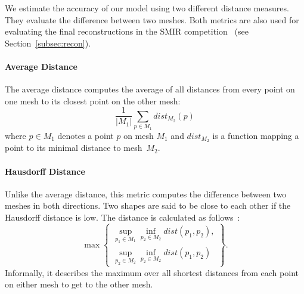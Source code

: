 We estimate the accuracy of our model using two different distance measures.
They evaluate the difference between two meshes.
Both metrics are also used for evaluating the final reconstructions in the SMIR competition~\cite{smir} (see Section~\ref{subsec:recon}).

\paragraph{Average Distance}
The average distance computes the average of all distances from every point on one mesh to its closest point on the other mesh:
$$ \frac{1}{|M_1|} \sum_{p \in M_1} \mathit{dist}_{M_2}(p) $$
where $p \in M_1$ denotes a point $p$ on mesh $M_1$ and $\mathit{dist}_{M_2}$ is a function mapping a point to its minimal distance to mesh~$M_2$.

\paragraph{Hausdorff Distance}
Unlike the average distance, this metric computes the difference between two meshes in both directions.
Two shapes are said to be close to each other if the Hausdorff distance is low.
The distance is calculated as follows~\cite{hausdorff}:
$$ \max \left\{ \begin{array}{ll}
  \sup_{p_1 \in M_1} \inf_{p_2 \in M_2} \mathit{dist}(p_1, p_2), \\
  \sup_{p_2 \in M_2} \inf_{p_2 \in M_2} \mathit{dist}(p_1, p_2) 
\end{array}\right\}. $$
Informally, it describes the maximum over all shortest distances from each point on either mesh to get to the other mesh.
